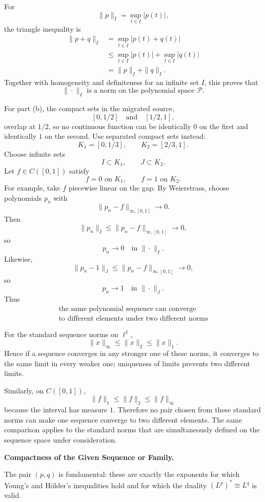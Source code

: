 \begin{solution}
For
\[
\|p\|_I
=
\sup_{t\in I}|p(t)|,
\]
the triangle inequality is
\[
\begin{aligned}
\|p+q\|_I
&=
\sup_{t\in I}|p(t)+q(t)|\\
&\le
\sup_{t\in I}|p(t)|
+
\sup_{t\in I}|q(t)|\\
&=
\|p\|_I+\|q\|_I.
\end{aligned}
\]
Together with homogeneity and definiteness for an infinite set \(I\), this proves that
\[
\boxed{\|\cdot\|_I\text{ is a norm on the polynomial space }\mathcal P.}
\]

For part (b), the compact sets in the migrated source,
\[
[0,1/2]
\quad\text{and}\quad
[1/2,1],
\]
overlap at \(1/2\), so no continuous function can be identically \(0\) on the first and
identically \(1\) on the second. Use separated compact sets instead:
\[
K_1=[0,1/3],
\qquad
K_2=[2/3,1].
\]
Choose infinite sets
\[
I\subset K_1,
\qquad
J\subset K_2.
\]
Let \(f\in C([0,1])\) satisfy
\[
f=0\text{ on }K_1,
\qquad
f=1\text{ on }K_2.
\]
For example, take \(f\) piecewise linear on the gap. By Weierstrass, choose polynomials
\(p_n\) with
\[
\|p_n-f\|_{\infty,[0,1]}\to0.
\]
Then
\[
\|p_n\|_I
\le
\|p_n-f\|_{\infty,[0,1]}
\to0,
\]
so
\[
p_n\to0
\quad\text{in }\|\cdot\|_I.
\]
Likewise,
\[
\|p_n-1\|_J
\le
\|p_n-f\|_{\infty,[0,1]}
\to0,
\]
so
\[
p_n\to1
\quad\text{in }\|\cdot\|_J.
\]
Thus
\[
\boxed{\begin{gathered}
\text{the same polynomial sequence can converge}
\\
\text{to different elements under two different norms}
\end{gathered}}
\]

For the standard sequence norms on \(\ell^1\),
\[
\|x\|_\infty
\le
\|x\|_2
\le
\|x\|_1.
\]
Hence if a sequence converges in any stronger one of these norms, it converges to the same
limit in every weaker one; uniqueness of limits prevents two different limits.

Similarly, on \(C([0,1])\),
\[
\|f\|_1
\le
\|f\|_2
\le
\|f\|_\infty
\]
because the interval has measure \(1\). Therefore no pair chosen from these standard norms
can make one sequence converge to two different elements. The same comparison applies to
the standard norms that are simultaneously defined on the sequence space under
consideration.
\end{solution}


\begin{problem}[CP-II-0486]
\label{prob:cp-ii-0486}
\textbf{Compactness of the Given Sequence or Family.}

\hspace*{1.5em}The pair $(p,q)$ is fundamental: these are exactly the exponents
	for which Young's and Hölder's inequalities hold and for which the
	duality $(L^p)^* \cong L^q$ is valid.

\bigskip
\end{problem}

